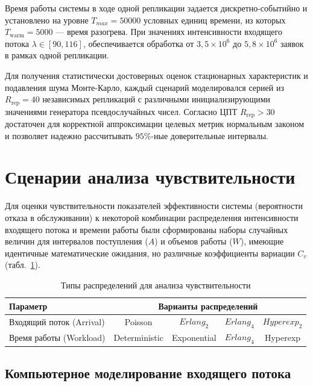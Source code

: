 Время работы системы в ходе одной репликации задается дискретно-событийно и установлено на уровне $T_{max} = 50000$ условных единиц времени, из которых $T_{\text{warm}} = 5000$ --- время разогрева. При значениях интенсивности входящего потока $\lambda \in [90, 116]$, обеспечивается обработка от $3,5 \times 10^6 \text{ до } 5,8 \times 10^6$ заявок в рамках одной репликации. 

Для получения статистически достоверных оценок стационарных характеристик и подавления шума Монте-Карло, каждый сценарий моделировался серией из $R_{\text{rep}} = 40$ независимых репликаций с различными инициализирующими значениями генератора псевдослучайных чисел\cite{law2015_simulation_modeling,fishman1996_monte_carlo}. Согласно ЦПТ  $R_{\text{rep}} > 30$ достаточен для корректной аппроксимации целевых метрик нормальным законом и позволяет надежно рассчитывать $95\%$-ные доверительные интервалы. 

\section{Сценарии анализа чувствительности}
\label{sec:sensitivity_scenarios}

Для оценки чувствительности показателей эффективности системы (вероятности отказа в обслуживании) к некоторой комбинации распределения интенсивности входящего потока и времени работы были сформированы наборы случайных величин для интервалов поступления ($A$) и объемов работы ($W$), имеющие идентичные математические ожидания, но различные коэффициенты вариации $C_v$ (табл.~\ref{tab:dist_families}).

\begin{table}[h!]
    \centering
    \caption{Типы распределений для анализа чувствительности}
    \label{tab:dist_families}
    \begin{tabular}{|l|c|c|c|c|}
        \hline
        \textbf{Параметр} & \multicolumn{4}{c|}{\textbf{Варианты распределений}} \\ \hline
        Входящий поток (Arrival) & Poisson & $Erlang_2$ & $Erlang_4$ & $Hyperexp_2$ \\ \hline
        Время работы (Workload) & Deterministic & Exponential & $Erlang_4$ & Hyperexp \\ \hline
    \end{tabular}
\end{table}

\subsection{Компьютерное моделирование входящего потока}

